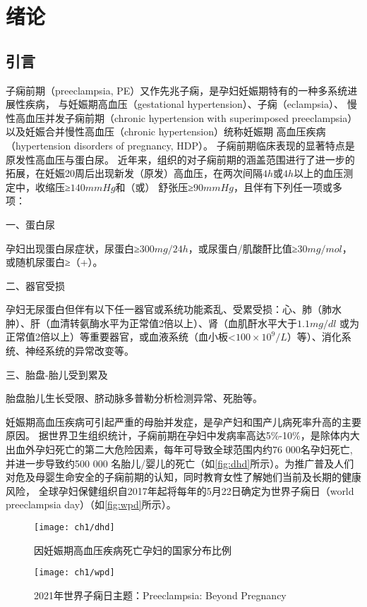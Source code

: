 \chapter{绪论}

\section{引言}
子痫前期（preeclampsia, PE）又作先兆子痫，是孕妇妊娠期特有的一种多系统进展性疾病， 与妊娠期高血压（gestational hypertension）、子痫（eclampsia）、
慢性高血压并发子痫前期（chronic hypertension with superimposed preeclampsia）以及妊娠合并慢性高血压（chronic hypertension）统称妊娠期
高血压疾病（hypertension disorders of pregnancy, HDP）\cite{OAG9,HDASOM,2000s1}。
子痫前期临床表现的显著特点是原发性高血压与蛋白尿。
近年来，组织的对子痫前期的涵盖范围进行了进一步的拓展，在妊娠20周后出现新发（原发）高血压，在两次间隔$4h$或$4h$以上的血压测定中，收缩压≥$140mmHg$和（或）
舒张压≥$90mmHg$，且伴有下列任一项或多项\cite{OAG9,FIGO}：

一、蛋白尿

孕妇出现蛋白尿症状，尿蛋白≥$300mg/24h$，或尿蛋白/肌酸酐比值≥$30mg/mol$，或随机尿蛋白≥（+）。

二、器官受损

孕妇无尿蛋白但伴有以下任一器官或系统功能紊乱、受累受损：心、肺（肺水肿）、肝（血清转氨酶水平为正常值2倍以上）、肾（血肌酐水平大于$1.1mg/dl$
或为正常值2倍以上）等重要器官，或血液系统（血小板<$100 \times 10^{9}/L$）等）、消化系统、神经系统的异常改变等。

三、胎盘-胎儿受到累及

胎盘胎儿生长受限、脐动脉多普勒分析检测异常、死胎等。

妊娠期高血压疾病可引起严重的母胎并发症，是孕产妇和围产儿病死率升高的主要原因\cite{OAG9}。
据世界卫生组织统计，子痫前期在孕妇中发病率高达5\%-10\%，是除体内大出血外孕妇死亡的第二大危险因素\cite{LCT2006}，每年可导致全球范围内约76 000名孕妇死亡,并进一步导致约500 000
名胎儿/婴儿的死亡\cite{DAM2015,LCT2006}（如\autoref{fig:dhd}所示）。为推广普及人们对危及母婴生命安全的子痫前期的认知，同时教育女性了解她们当前及长期的健康风险，
全球孕妇保健组织自2017年起将每年的5月22日确定为世界子痫日（world preeclampsia day）（如\autoref{fig:wpd}所示）。
\begin{figure}[htbp]
    \centering
    \texttt{[image: ch1/dhd]}
    \caption{\label{fig:dhd}因妊娠期高血压疾病死亡孕妇的国家分布比例}
\end{figure}
\begin{figure}[htbp]
    \centering
    \texttt{[image: ch1/wpd]}
    \caption{\label{fig:wpd}2021年世界子痫日主题：Preeclampsia: Beyond Pregnancy}
\end{figure}

